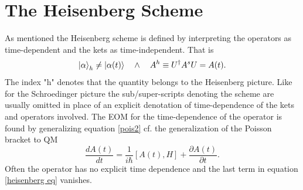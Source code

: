 \section{The Heisenberg Scheme}
As mentioned the Heisenberg scheme is defined by interpreting the operators as time-dependent and the kets as time-independent. That is
\begin{equation}
	\ket{\alpha}_h\neq \ket{\alpha(t)} \quad \wedge \quad A^{h}\equiv U^\dagger A^sU=A(t).
\end{equation}   
The index "h" denotes that the quantity belongs to the Heisenberg picture. Like for the Schroedinger picture the sub/super-scripts denoting the scheme are usually omitted in place of an explicit denotation of time-dependence of the kets and operators involved.
The EOM for the time-dependence of the operator is found by generalizing equation \eqref{pois2} cf. the generalization of the Poisson bracket to QM
\begin{equation}
	\frac{dA(t)}{dt}=\frac{1}{i\hbar}[A(t),H]+\frac{\partial A(t)}{\partial t}.
	\label{heisenberg eq}
\end{equation}   
Often the operator has no explicit time dependence and the last term in equation \eqref{heisenberg eq} vanishes.
